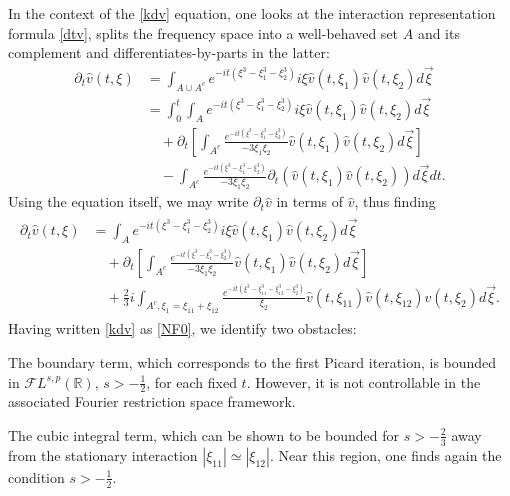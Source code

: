 \documentclass[%
11pt,  reqno]{amsart}
\newcommand{\5}{\textup{V}}
\newcommand{\noi}{\noindent}
\newcommand{\FL}{\mathcal{F} L}
\newcommand{\dt}{\partial_t}
\theoremstyle{remark}
\newcommand{\R}{\mathbb{R}}
\numberwithin{equation}{section}
\numberwithin{theorem}{section}
\begin{document}
	In the context of the \eqref{kdv} equation, one looks at the interaction representation formula \eqref{dtv}, splits the frequency space into a well-behaved set $A$ and its complement and differentiates-by-parts in the latter:
	\begin{align}
		\dt\widehat{v}(t,\xi)&= \int_{A\cup A^c}e^{-it (\xi^3 -
			\xi_1^3 - \xi_2^3) } i\xi \widehat{v}(t, \xi_1) \widehat{v}(t,\xi_2) d\vec{\xi} 
		\\&\label{NF00}=\int_0^t \int_{A}e^{-it (\xi^3 -
			\xi_1^3 - \xi_2^3) } i\xi \widehat{v}(t, \xi_1) \widehat{v}(t,\xi_2) d\vec{\xi} \\&\quad + \dt\left[ \int_{A^c}\frac{e^{-it (\xi^3 -
				\xi_1^3 - \xi_2^3) }}{-3\xi_1\xi_2}  \widehat{v}(t, \xi_1) \widehat{v}(t,\xi_2) d\vec{\xi}\right] \\&\quad- \int_{A^c}\frac{e^{-it (\xi^3 -
				\xi_1^3 - \xi_2^3) }}{-3\xi_1\xi_2}  \partial_t\left(\widehat{v}(t, \xi_1) \widehat{v}(t,\xi_2)\right) d\vec{\xi}dt
		.
	\end{align}
	Using the equation itself, we may write $\partial_t\widehat{v}$ in terms of $\widehat{v}$, thus finding
	\begin{align}
		\label{NF0}
		\begin{split}
			\dt\widehat{v}(t,\xi)&=  \int_{A}e^{-it (\xi^3 -
				\xi_1^3 - \xi_2^3) } i\xi \widehat{v}(t, \xi_1) \widehat{v}(t,\xi_2) d\vec{\xi}\\&\quad + \dt\left[ \int_{A^c}\frac{e^{-it (\xi^3 -
					\xi_1^3 - \xi_2^3) }}{-3\xi_1\xi_2}  \widehat{v}(t, \xi_1) \widehat{v}(t,\xi_2) d\vec{\xi}\right] \\
			&\quad
			+\frac23 i
			\int_{A^c, \xi_1=\xi_{11}+\xi_{12}}\frac{e^{-it (\xi^3 -
					\xi_{11}^3-
					\xi_{12}^3 - \xi_2^3) }}{\xi_2}  \widehat{v}(t, \xi_{11})\widehat{v}(t, \xi_{12}) \widehat{v}(t,\xi_2) d\vec{\xi}
			.
		\end{split}
	\end{align}
Having written \eqref{kdv} as \eqref{NF0}, we identify two obstacles:

\smallskip
\noi{\rm(i)} The boundary term, which corresponds to the first Picard iteration, is bounded in $\FL^{s,p}(\R)$, $s>-\frac12$, for each fixed $t$. However, it is not controllable in the associated Fourier restriction space framework.

\smallskip
\noi{\rm(ii)} The cubic integral term, which can be shown to be bounded for $s>-\frac23$ away from the stationary interaction $|\xi_{11}|\simeq |\xi_{12}|$. Near this region, one finds again the condition $s>-\frac12$.
\end{document}
